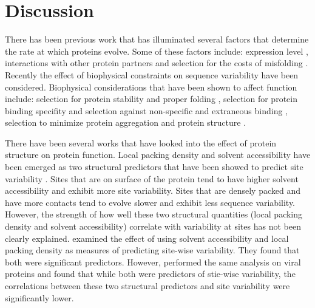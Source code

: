 \documentclass[12pt]{article}
\begin{document}
\section{Discussion}
\label{sec:dcr}

There has been previous work that has illuminated several factors that determine the rate at which proteins evolve. Some of these factors include: expression level \citep{Drummondetal2008, Wilkeetal2010, Paletal2001, Subramanianetal2004}, interactions with other protein partners \citep{Fraseretal2002, Yangetal2012, Minterisetal2005, Pangetal2010} and selection for the costs of misfolding \citep{Drummondetal2005}. Recently the effect of biophysical constraints on sequence variability have been considered. Biophysical considerations that have been shown to affect function include: selection for protein stability and proper folding \citep{Drummondetal2005}, selection for protein binding specifity \citep{Zarrinparetal2003}  and selection against non-specific and extraneous binding \citep{Levyetal2012}, selection to minimize protein aggregation \citep{DePristoetal2005} and protein structure \citep{Fransozaetal2009, Fransozaetal2012, Yehetal2014a, Yehetal2014b, Shahmoradietal2014, Echaveetal2015, Huangetal2014}.

\indent There have been several works that have looked into the effect of protein structure on protein function. Local packing density and solvent accessibility have been emerged as two structural predictors that have been showed to predict site variability \citep{Yehetal2014a, Yehetal2014b, Shahmoradietal2014, Fransozaetal2009, Bustamanteetal2000}. Sites that are on surface of the protein tend to have higher solvent accessibility and exhibit more site variability. Sites that are densely packed and have more contacts tend to evolve slower and exhibit less sequence variability. However, the strength of how well these two structural quantities (local packing density and solvent accessibility) correlate with variability at sites has not been clearly explained. \cite{Yehetal2014a} examined the effect of using solvent accessibility and local packing density as measures of predicting site-wise variability. They found that both were significant predictors. However, \cite{Shahmoradietal2014} performed the same analysis on viral proteins and found that while both were predictors of stie-wise variability, the correlations between these two structural predictors and site variability were significantly lower. 
\end{document}
